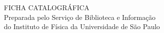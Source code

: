 \newpage
\thispagestyle{empty}
\vspace*{\fill}
\begin{center}
	FICHA CATALOGRÁFICA\\
	Preparada pelo Serviço de Biblioteca e Informação\\
	do Instituto de Física da Universidade de São Paulo\par
	
	\medskip
	
\end{center}